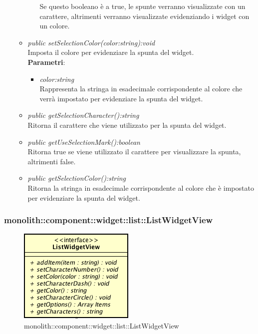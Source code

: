 \begin{itemize}
\begin{itemize}
\begin{itemize}
		Se questo booleano è a true, le spunte verranno visualizzate con un carattere, altrimenti verranno visualizzate evidenziando i widget con un colore.
		\end{itemize} 
	\item \textit{public setSelectionColor(color:string):void}\\
	Imposta il colore per evidenziare la spunta del widget.
		\\ \textbf{Parametri}: \begin{itemize}
		\item \textit{color:string}\\
		Rappresenta la stringa in esadecimale corrispondente al colore che verrà impostato per evidenziare la spunta del widget.
		\end{itemize} 
	\item \textit{public getSelectionCharacter():string}\\
	Ritorna il carattere che viene utilizzato per la spunta del widget.
	\item \textit{public getUseSelectionMark():boolean}\\
	Ritorna true se viene utilizzato il carattere per visualizzare la spunta, altrimenti false.
	\item \textit{public getSelectionColor():string}\\
	Ritorna la stringa in esadecimale corrispondente al colore che è impostato per evidenziare la spunta del widget.
	\end{itemize}
\end{itemize}

\subsubsection{monolith::component::widget::list::ListWidgetView}

\label{monolith::component::widget::list::ListWidgetView}
\begin{figure}[H]
	\centering
	\includegraphics[scale=0.5]{Sezioni/SottosezioniST/img/ListWidgetView.png}
	\caption{monolith::component::widget::list::ListWidgetView}
\end{figure}

